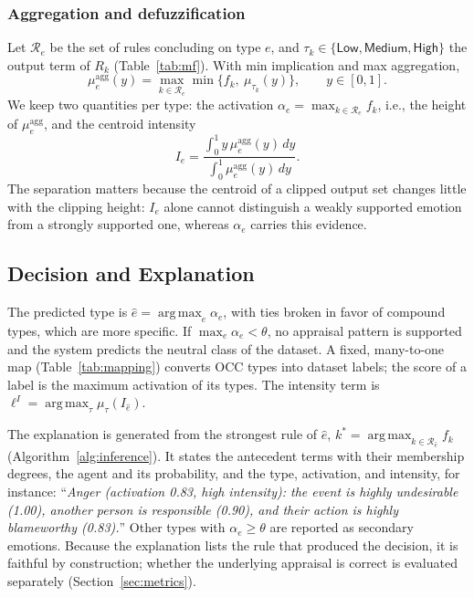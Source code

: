 \documentclass[conference, a4paper]{IEEEtran}
\newcommand{\term}[1]{\mathsf{#1}}
\DeclareMathOperator*{\argmax}{arg\,max}
\begin{document}
\subsubsection{Aggregation and defuzzification}
Let $\mathcal{R}_e$ be the set of rules concluding on type $e$, and $\tau_k \in \{\term{Low}, \term{Medium}, \term{High}\}$ the output term of $R_k$ (Table~\ref{tab:mf}). With min implication and max aggregation,
\begin{equation}
    \mu^{\mathrm{agg}}_{e}(y) = \max_{k \in \mathcal{R}_e} \min\big\{f_{k},\ \mu_{\tau_k}(y)\big\}, \qquad y \in [0,1].
\end{equation}
We keep two quantities per type: the activation $\alpha_{e} = \max_{k \in \mathcal{R}_e} f_{k}$, i.e., the height of $\mu^{\mathrm{agg}}_{e}$, and the centroid intensity
\begin{equation}
    I_{e} = \frac{\int_0^1 y\, \mu^{\mathrm{agg}}_{e}(y)\, dy}{\int_0^1 \mu^{\mathrm{agg}}_{e}(y)\, dy}.
\end{equation}
The separation matters because the centroid of a clipped output set changes little with the clipping height: $I_{e}$ alone cannot distinguish a weakly supported emotion from a strongly supported one, whereas $\alpha_{e}$ carries this evidence.

\subsection{Decision and Explanation}
\label{sec:decision}
The predicted type is $\hat e = \argmax_e \alpha_e$, with ties broken in favor of compound types, which are more specific. If $\max_e \alpha_e < \theta$, no appraisal pattern is supported and the system predicts the neutral class of the dataset. A fixed, many-to-one map (Table~\ref{tab:mapping}) converts OCC types into dataset labels; the score of a label is the maximum activation of its types. The intensity term is $\ell^I = \argmax_\tau \mu_\tau(I_{\hat e})$.

The explanation is generated from the strongest rule of $\hat e$, $k^\ast = \argmax_{k \in \mathcal{R}_{\hat e}} f_k$ (Algorithm~\ref{alg:inference}). It states the antecedent terms with their membership degrees, the agent and its probability, and the type, activation, and intensity, for instance: ``\textit{Anger (activation 0.83, high intensity): the event is highly undesirable (1.00), another person is responsible (0.90), and their action is highly blameworthy (0.83).}'' Other types with $\alpha_e \ge \theta$ are reported as secondary emotions. Because the explanation lists the rule that produced the decision, it is faithful by construction; whether the underlying appraisal is correct is evaluated separately (Section~\ref{sec:metrics}).
\end{document}
